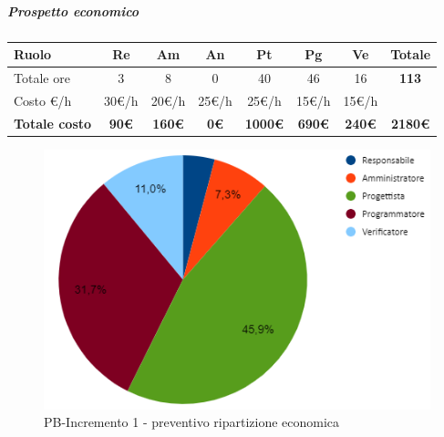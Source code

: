 \subparagraph{Prospetto economico}
\begin{center}
	\renewcommand{\arraystretch}{1.8} %
	\begin{tabular}{ |m{10em}|c|c|c|c|c|c|c| }
	\hline
	\textbf{Ruolo} & \textbf{Re} & \textbf{Am} &  \textbf{An} &  \textbf{Pt} &  \textbf{Pg} &  \textbf{Ve} &  \textbf{Totale}\\
    \hline
    Totale ore & 3 & 8 & 0 & 40 & 46 & 16 & \textbf{113}\\
    \hline
    Costo \euro/h & 30\euro/h & 20\euro/h & 25\euro/h & 25\euro/h & 15\euro/h & 15\euro/h & \\
    \hline
    \textbf{Totale costo} & \textbf{90\euro} & \textbf{160\euro} &  \textbf{0\euro} &  \textbf{1000\euro} &  \textbf{690\euro} &  \textbf{240\euro} &  \textbf{2180\euro}\\
    \hline
	\end{tabular}

    \begin{figure}[H]
       \centering\includegraphics{images/preventivo/PB-incremento1-costo.png}
       \caption{PB-Incremento 1 - preventivo ripartizione economica}
    \end{figure}
\end{center}



